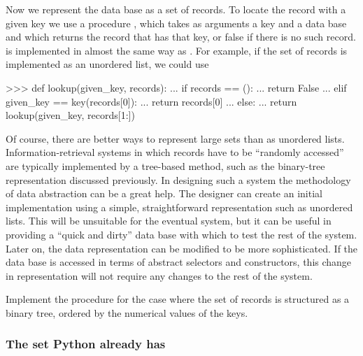 Now we represent the data base as a set of records. To locate the record with a
given key we use a procedure , which takes as arguments a key and
a data base and which returns the record that has that key, or false if there
is no such record.   is implemented in almost the same way as
.  For example, if the set of records is implemented
as an unordered list, we could use

\begin{codeBlock}
>>> def lookup(given_key, records):
...     if records == ():
...         return False
...     elif given_key == key(records[0]):
...         return records[0]
...     else:
...         return lookup(given_key, records[1:])
\end{codeBlock}

\noindent
Of course, there are better ways to represent large sets than as unordered
lists.  Information-retrieval systems in which records have to be ``randomly
accessed'' are typically implemented by a tree-based method, such as the
binary-tree representation discussed previously.  In designing such a system
the methodology of data abstraction can be a great help.  The designer can
create an initial implementation using a simple, straightforward representation
such as unordered lists.  This will be unsuitable for the eventual system, but
it can be useful in providing a ``quick and dirty'' data base with which to
test the rest of the system.  Later on, the data representation can be modified
to be more sophisticated.  If the data base is accessed in terms of abstract
selectors and constructors, this change in representation will not require any
changes to the rest of the system.

\begin{exerciseGroup}
\label{Exercise 2.66}
 Implement the 
procedure for the case where the set of records is structured as a binary tree,
ordered by the numerical values of the keys.
\end{exerciseGroup}


\subsubsection*{The set Python already has}

